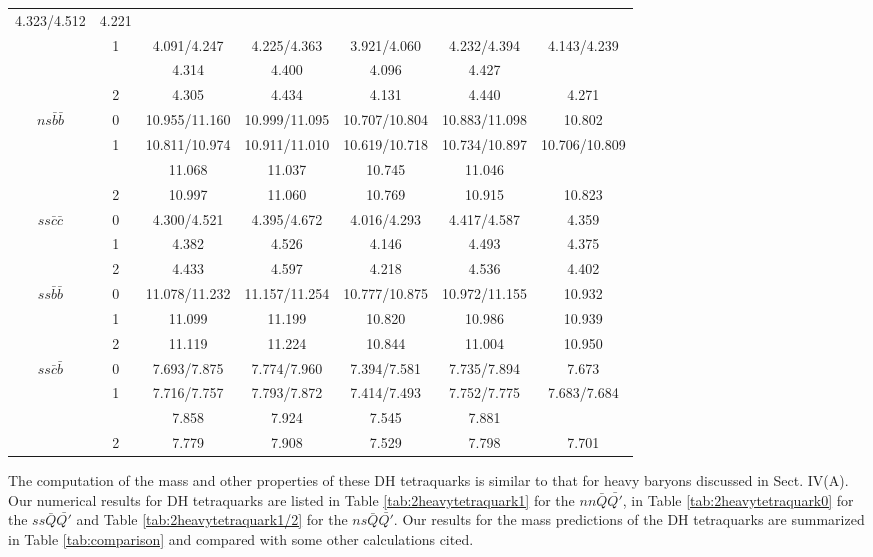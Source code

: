 \documentclass[12pt,prd,onecolumn,floatfix,nofootinbib]{revtex4}
\begin{document}
\begin{table}[!htb]
\begin{tabular}{ccccccc}
4.323/4.512 & 4.221 \\
& \multirow{2}{*}{1} & 4.091/4.247 & 4.225/4.363 & 3.921/4.060 &
4.232/4.394 & \multirow{2}{*}{4.143/4.239} \\
& & 4.314 & 4.400 & 4.096 & 4.427 & \\
& 2 & 4.305 & 4.434 & 4.131 & 4.440 & 4.271 \\
$ns\bar{b}\bar{b}$ & 0 & 10.955/11.160 & 10.999/11.095 & 10.707/10.804 &
10.883/11.098 & 10.802 \\
& \multirow{2}{*}{1} & 10.811/10.974 & 10.911/11.010 & 10.619/10.718 &
10.734/10.897 & \multirow{2}{*}{10.706/10.809} \\
& & 11.068 & 11.037 & 10.745 & 11.046 & \\
& 2 & 10.997 & 11.060 & 10.769 & 10.915 & 10.823 \\
$ss\bar{c}\bar{c}$ & 0 & 4.300/4.521 & 4.395/4.672 & 4.016/4.293 &
4.417/4.587 & 4.359 \\
& 1 & 4.382 & 4.526 & 4.146 & 4.493 & 4.375 \\
& 2 & 4.433 & 4.597 & 4.218 & 4.536 & 4.402 \\
$ss\bar{b}\bar{b}$ & 0 & 11.078/11.232 & 11.157/11.254 & 10.777/10.875 &
10.972/11.155 & 10.932 \\
& 1 & 11.099 & 11.199 & 10.820 & 10.986 & 10.939 \\
& 2 & 11.119 & 11.224 & 10.844 & 11.004 & 10.950 \\
$ss\bar{c}\bar{b}$ & 0 & 7.693/7.875 & 7.774/7.960 & 7.394/7.581 &
7.735/7.894 & 7.673 \\
& \multirow{2}{*}{1} & 7.716/7.757 & 7.793/7.872 & 7.414/7.493 &
7.752/7.775 & \multirow{2}{*}{7.683/7.684} \\
& & 7.858 & 7.924 & 7.545 & 7.881 & \\
& 2 & 7.779 & 7.908 & 7.529 & 7.798 & 7.701 \\ \hline\hline
\end{tabular}%
\end{table}

The computation of the mass and other properties of these DH tetraquarks is
similar to that for heavy baryons discussed in Sect. IV(A). Our numerical
results for DH tetraquarks are listed in Table \ref{tab:2heavytetraquark1}
for the $nn\bar{Q}\bar{Q\prime }$, in Table \ref{tab:2heavytetraquark0} for
the $ss\bar{Q}\bar{Q\prime }$ and Table \ref{tab:2heavytetraquark1/2} for
the $ns\bar{Q}\bar{Q\prime }$. Our results for the mass predictions of the
DH tetraquarks are summarized in Table \ref{tab:comparison} and compared
with some other calculations cited.
\end{document}
